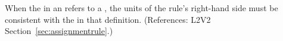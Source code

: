 When the  in an \AssignmentRule refers to a \Parameter, the
units of the rule's right-hand side must be consistent with the
 in that \Parameter definition.  (References: L2V2
Section~\ref{sec:assignmentrule}.)
